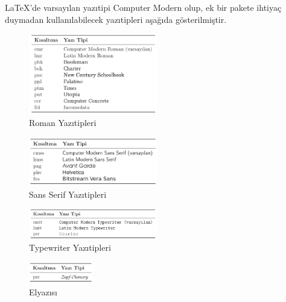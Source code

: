 \documentclass[
  letterpaper,
  DIV=11,
  numbers=noendperiod]{scrreprt}
\begin{document}
{\LaTeX}'de varsayılan yazıtipi Computer Modern olup, ek bir pakete
ihtiyaç duymadan kullanılabilecek yazıtipleri aşağıda gösterilmiştir.

\begin{figure}

{\centering \includegraphics[width=0.5\textwidth,height=\textheight]{./images/yazitipi2.png}

}

\caption{Roman Yazıtipleri}

\end{figure}

\begin{figure}

{\centering \includegraphics[width=0.5\textwidth,height=\textheight]{./images/yazitipi3.png}

}

\caption{Sans Serif Yazıtipleri}

\end{figure}

\begin{figure}

{\centering \includegraphics[width=0.5\textwidth,height=\textheight]{./images/yazitipi4.png}

}

\caption{Typewriter Yazıtipleri\\
}

\end{figure}

\begin{figure}

{\centering \includegraphics[width=0.25\textwidth,height=\textheight]{./images/yazitipi5.png}

}

\caption{Elyazısı}

\end{figure}
\end{document}
